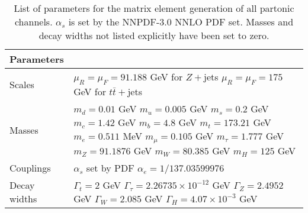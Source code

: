 \documentclass[main.tex]{subfiles}
\begin{document}
\begin{table}[t]
    \centering
    \begin{tabular}{ll}
        \toprule
        Parameters & \\
        \midrule
        Scales & \makecell[l]{$\mu_{R} = \mu_{F} = 91.188$ GeV for $Z+$jets \\ $\mu_{R} = \mu_{F} = 175$ GeV for $t\bar{t}+$jets} \\
        \midrule
        Masses & \makecell[l]{$m_{d} = 0.01$ GeV \\ $m_{u} = 0.005$ GeV \\ $m_{s} = 0.2$ GeV \\ $m_{c} = 1.42$ GeV \\ $m_{b} = 4.8$ GeV \\ $m_{t} = 173.21$ GeV \\ $m_{e} = 0.511$ MeV \\ $m_{\mu} = 0.105$ GeV \\ $m_{\tau} = 1.777$ GeV \\ $m_{Z} = 91.1876$ GeV \\ $m_{W} = 80.385$ GeV \\ $m_{H} = 125$ GeV} \\
        \midrule
        Couplings & \makecell[l]{$\alpha_{s}$ set by PDF \\ $\alpha_{e} = 1/137.03599976$} \\
        \midrule
        Decay widths & \makecell[l]{$\Gamma_{t} = 2$ GeV \\ $\Gamma_{\tau} = 2.26735 \times 10^{-12}$ GeV \\ $\Gamma_{Z} = 2.4952$ GeV \\ $\Gamma_{W} = 2.085$ GeV \\ $\Gamma_{H} = 4.07 \times 10^{-3}$ GeV} \\
        \bottomrule
        \end{tabular}
    \caption{List of parameters for the matrix element generation of all partonic channels. $\alpha_{s}$ is set by the NNPDF-3.0 NNLO PDF set. Masses and decay widths not listed explicitly have been set to zero.}
    \label{table:fame3_params}
\end{table}
\end{document}
